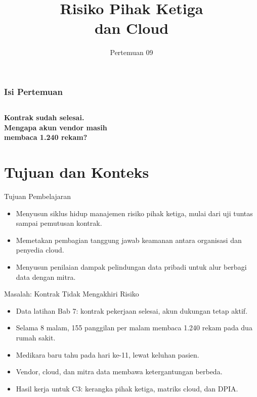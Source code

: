 \documentclass[aspectratio=169, table, 12pt]{beamer}
\title{\Huge Risiko Pihak Ketiga\\ \vspace{10pt} dan Cloud}
\date{Pertemuan 09}
\begin{document}
\frame{\titlepage}

\begin{frame}
  \frametitle{Isi Pertemuan}
  \vspace{14pt}
  \begin{columns}[t]
    {\small\tableofcontents[sections={1-4}]}

    {\small\tableofcontents[sections={5-7}]}
  \end{columns}
\end{frame}

\begin{frame}{\hfill}
  \centering
  \Huge{\textbf{Kontrak sudah selesai.\\Mengapa akun vendor masih\\membaca 1.240 rekam?}}
\end{frame}

\section{Tujuan dan Konteks}

\begin{frame}{{\Large Tujuan Pembelajaran}}
  \vspace{10pt}
  \begin{itemize}
    \item Menyusun siklus hidup manajemen risiko pihak ketiga, mulai dari uji tuntas sampai
          pemutusan kontrak.
    \item Memetakan pembagian tanggung jawab keamanan antara organisasi dan penyedia cloud.
    \item Menyusun penilaian dampak pelindungan data pribadi untuk alur berbagi data dengan mitra.
  \end{itemize}
\end{frame}

\begin{frame}{{\Large Masalah: Kontrak Tidak Mengakhiri Risiko}}
  \vspace{6pt}
  \small
  \begin{itemize}
    \item Data latihan Bab 7: kontrak pekerjaan selesai, akun dukungan tetap aktif.
    \item Selama 8 malam, 155 panggilan per malam membaca 1.240 rekam pada dua rumah sakit.
    \item Medikara baru tahu pada hari ke-11, lewat keluhan pasien.
    \item Vendor, cloud, dan mitra data membawa ketergantungan berbeda.
    \item Hasil kerja untuk C3: kerangka pihak ketiga, matriks cloud, dan DPIA.
  \end{itemize}
\end{frame}
\end{document}
